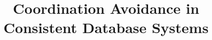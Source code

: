 \documentclass{sig-alternate}
\theoremstyle{definition}
\theoremstyle{remark}
\begin{document}
%

\title{Coordination Avoidance in Consistent Database Systems}

\maketitle






















\scriptsize
 
\end{document}
